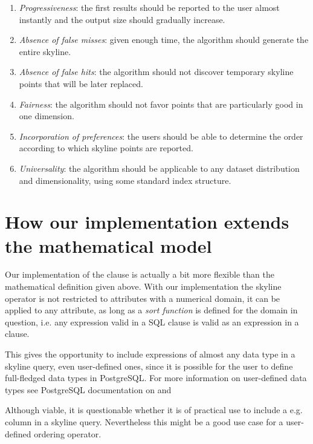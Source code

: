 \begin{enumerate}
\item \emph{Progressiveness}: the first results should be reported to the user almost instantly and the output size should gradually increase.

\item \emph{Absence of false misses}: given enough time, the algorithm should generate the entire skyline.

\item \emph{Absence of false hits}: the algorithm should not discover temporary skyline points that will be later replaced.

\item \emph{Fairness}: the algorithm should not favor points that are particularly good in one dimension.

\item \emph{Incorporation of preferences}: the users should be able to determine the order according to which skyline points are reported.

\item \emph{Universality}: the algorithm should be applicable to any dataset distribution and dimensionality, using some standard index structure.
\end{enumerate}


\section{How our implementation extends the mathematical model}
Our implementation of the  clause is actually a
bit more flexible than the mathematical definition given above. With
our implementation the skyline operator is not restricted to
attributes with a numerical domain, it can be applied to any
attribute, as long as a \emph{sort function} is defined for the domain
in question, i.e.\/ any expression valid in a SQL 
clause is valid as an expression in a  clause.

This gives the opportunity to include expressions of almost any data
type in a skyline query, even user-defined ones, since it is possible
for the user to define full-fledged data types in PostgreSQL. For more
information on user-defined data types see PostgreSQL documentation on
 and

Although viable, it is questionable whether it is of practical use to include a
e.g.  column in a skyline query.
Nevertheless this might be a good use case for a user-defined ordering operator.

